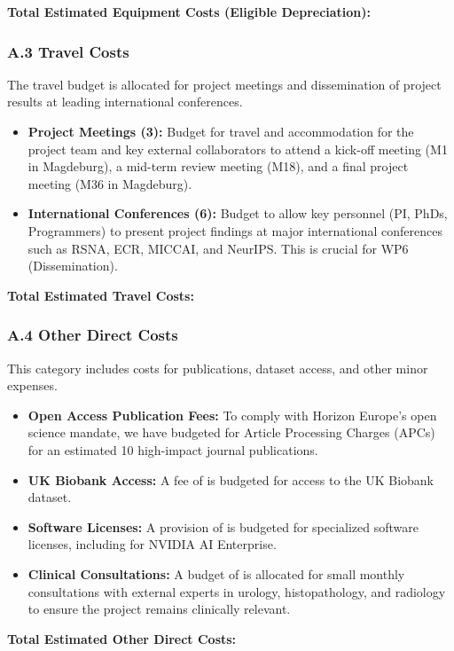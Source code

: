 \documentclass[11pt, a4paper]{article}
\begin{document}
\textbf{Total Estimated Equipment Costs (Eligible Depreciation): }

\subsubsection*{A.3 Travel Costs}
The travel budget is allocated for project meetings and dissemination of project results at leading international conferences.
\begin{itemize}
    \item \textbf{Project Meetings (3):} Budget for travel and accommodation for the project team and key external collaborators to attend a kick-off meeting (M1 in Magdeburg), a mid-term review meeting (M18), and a final project meeting (M36 in Magdeburg).
    \item \textbf{International Conferences (6):} Budget to allow key personnel (PI, PhDs, Programmers) to present project findings at major international conferences such as RSNA, ECR, MICCAI, and NeurIPS. This is crucial for WP6 (Dissemination).
\end{itemize}

\textbf{Total Estimated Travel Costs: }

\subsubsection*{A.4 Other Direct Costs}
This category includes costs for publications, dataset access, and other minor expenses.
\begin{itemize}
    \item \textbf{Open Access Publication Fees:} To comply with Horizon Europe's open science mandate, we have budgeted for Article Processing Charges (APCs) for an estimated 10 high-impact journal publications.
    \item \textbf{UK Biobank Access:} A fee of  is budgeted for access to the UK Biobank dataset.
    \item \textbf{Software Licenses:} A provision of  is budgeted for specialized software licenses, including for NVIDIA AI Enterprise.
    \item \textbf{Clinical Consultations:} A budget of  is allocated for small monthly consultations with external experts in urology, histopathology, and radiology to ensure the project remains clinically relevant.
\end{itemize}

\textbf{Total Estimated Other Direct Costs: }
\end{document}
